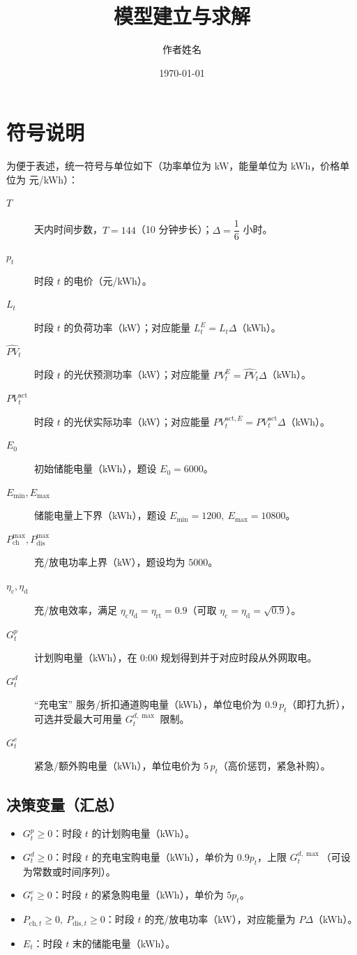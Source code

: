 \documentclass[12pt]{article}
\title{模型建立与求解}
\author{作者姓名}
\date{\today}
\begin{document}
\maketitle

\section{符号说明}
为便于表述，统一符号与单位如下（功率单位为 kW，能量单位为 kWh，价格单位为 元/kWh）：

\begin{description}
  \item[$T$] 天内时间步数，$T=144$（10 分钟步长）；$\Delta=\dfrac{1}{6}$ 小时。
  \item[$p_t$] 时段 $t$ 的电价（元/kWh）。
  \item[$L_t$] 时段 $t$ 的负荷功率（kW）；对应能量 $L_t^E=L_t\Delta$（kWh）。
  \item[$\widehat{PV}_t$] 时段 $t$ 的光伏预测功率（kW）；对应能量 $PV_t^E=\widehat{PV}_t\Delta$（kWh）。
  \item[$PV_t^{\mathrm{act}}$] 时段 $t$ 的光伏实际功率（kW）；对应能量 $PV_t^{\mathrm{act},E}=PV_t^{\mathrm{act}}\Delta$（kWh）。
  \item[$E_0$] 初始储能电量（kWh），题设 $E_0=6000$。
  \item[$E_{\min},E_{\max}$] 储能电量上下界（kWh），题设 $E_{\min}=1200,\ E_{\max}=10800$。
  \item[$P_{\mathrm{ch}}^{\max},P_{\mathrm{dis}}^{\max}$] 充/放电功率上界（kW），题设均为 $5000$。
  \item[$\eta_{\mathrm{c}},\eta_{\mathrm{d}}$] 充/放电效率，满足 $\eta_{\mathrm{c}}\eta_{\mathrm{d}}=\eta_{\mathrm{rt}}=0.9$（可取 $\eta_{\mathrm{c}}=\eta_{\mathrm{d}}=\sqrt{0.9}$）。
  \item[$G^p_t$] 计划购电量（kWh），在 0:00 规划得到并于对应时段从外网取电。
  \item[$G^d_t$] ``充电宝'' 服务/折扣通道购电量（kWh），单位电价为 $0.9\,p_t$（即打九折），可选并受最大可用量 $G^{d,\max}_t$ 限制。
  \item[$G^e_t$] 紧急/额外购电量（kWh），单位电价为 $5\,p_t$（高价惩罚，紧急补购）。
\end{description}

\subsection{决策变量（汇总）}
\begin{itemize}
  \item $G^p_t\ge0$：时段 $t$ 的计划购电量（kWh）。
  \item $G^d_t\ge0$：时段 $t$ 的充电宝购电量（kWh），单价为 $0.9p_t$，上限 $G^{d,\max}_t$（可设为常数或时间序列）。
  \item $G^e_t\ge0$：时段 $t$ 的紧急购电量（kWh），单价为 $5p_t$。
  \item $P_{\mathrm{ch},t}\ge0,\ P_{\mathrm{dis},t}\ge0$：时段 $t$ 的充/放电功率（kW），对应能量为 $P\Delta$（kWh）。
  \item $E_t$：时段 $t$ 末的储能电量（kWh）。
\end{itemize}
\end{document}
